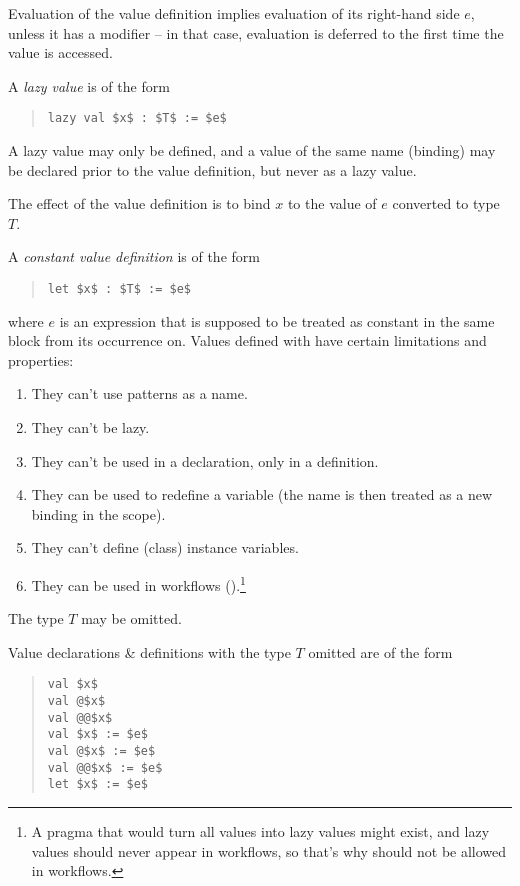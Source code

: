 Evaluation of the value definition implies evaluation of its right-hand side $e$, unless it has a modifier  -- in that case, evaluation is deferred to the first time the value is accessed. 

A {\em lazy value} is of the form
\begin{quote}\begin{lstlisting}
lazy val $x$ : $T$ := $e$
\end{lstlisting}\end{quote}

A lazy value may only be defined, and a value of the same name (binding) may be declared prior to the value definition, but never as a lazy value. 

The effect of the value definition is to bind $x$ to the value of $e$ converted to type $T$. 

A {\em constant value definition} is of the form 
\begin{quote}\begin{lstlisting}
let $x$ : $T$ := $e$
\end{lstlisting}\end{quote}
where $e$ is an expression that is supposed to be treated as constant in the same block from its occurrence on. Values defined with  have certain limitations and properties:

\begin{enumerate}
\item They can't use patterns as a name. 
\item They can't be lazy. 
\item They can't be used in a declaration, only in a definition. 
\item They can be used to redefine a variable (the name is then treated as a new binding in the scope). 
\item They can't define (class) instance variables. 
\item They can be used in workflows ().\footnote{A pragma that would turn all values into lazy values might exist, and lazy values should never appear in workflows, so that's why  should not be allowed in workflows.}
\end{enumerate}

The type $T$ may be omitted. 

Value declarations \& definitions with the type $T$ omitted are of the form
\begin{quote}\begin{lstlisting}
val $x$
val @$x$
val @@$x$
val $x$ := $e$
val @$x$ := $e$
val @@$x$ := $e$
let $x$ := $e$
\end{lstlisting}\end{quote}

